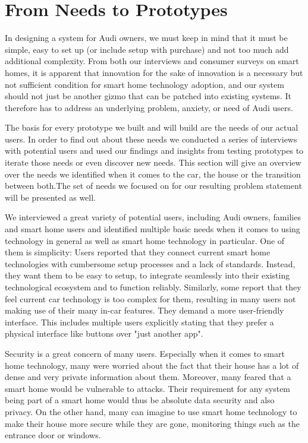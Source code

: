\section{From Needs to Prototypes} %

In designing a system for Audi owners, we must keep in mind that it must be simple, easy to set up (or include setup with purchase) and not too much add additional complexity. From both our interviews and consumer surveys on smart homes, it is apparent that innovation for the sake of innovation is a necessary but not sufficient condition for smart home technology adoption, and our system should not just be another gizmo that can be patched into existing systems. It therefore has to address an underlying problem, anxiety, or need of Audi users.

The basis for every prototype we built and will build are the needs of our actual users. In order to find out about these needs we conducted a series of interviews with potential users and used our findings and insights from testing prototypes to iterate those needs or even discover new needs. This section will give an overview over the needs we identified when it comes to the car, the house or the transition between both.The set of needs we focused on for our resulting problem statement will be presented as well.

We interviewed a great variety of potential users, including Audi owners, families and smart home users and identified multiple basic needs when it comes to using technology in general as well as smart home technology in particular. One of them is simplicity: Users reported that they connect current smart home technologies with cumbersome setup processes and a lack of standards. Instead, they want them to be easy to setup, to integrate seamlessly into their existing technological ecosystem and to function reliably. Similarly, some report that they feel current car technology is too complex for them, resulting in many users not making use of their many in-car features. They demand a more user-friendly interface. This includes multiple users explicitly stating that they prefer a physical interface like buttons over "just another app".

Security is a great concern of many users. Especially when it comes to smart home technology, many were worried about the fact that their house has a lot of dense and very private information about them. Moreover, many feared that a smart home would be vulnerable to attacks. Their requirement for any system being part of a smart home would thus be absolute data security and also privacy. On the other hand, many can imagine to use smart home technology to make their house more secure while they are gone, monitoring things such as the entrance door or windows. 

